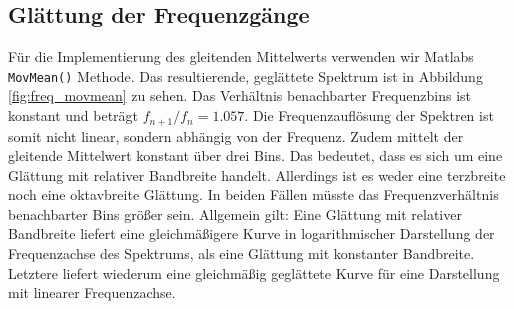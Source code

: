 \subsection{Glättung der Frequenzgänge}
Für die Implementierung des gleitenden Mittelwerts verwenden wir Matlabs \texttt{MovMean()} Methode.
Das resultierende, geglättete Spektrum ist in Abbildung \ref{fig:freq_movmean} zu sehen. Das Verhältnis benachbarter Frequenzbins ist konstant und beträgt $f_{n+1}/f_{n} = 1.057$.
Die Frequenzauflösung der Spektren ist somit nicht linear, sondern abhängig von der Frequenz.
Zudem mittelt der gleitende Mittelwert konstant über drei Bins.
Das bedeutet, dass es sich um eine Glättung mit relativer Bandbreite handelt.
Allerdings ist es weder eine terzbreite noch eine oktavbreite Glättung.
In beiden Fällen müsste das Frequenzverhältnis benachbarter Bins größer sein.
Allgemein gilt: Eine Glättung mit relativer Bandbreite liefert eine gleichmäßigere Kurve in logarithmischer Darstellung der Frequenzachse des Spektrums, als eine Glättung mit konstanter Bandbreite.
Letztere liefert wiederum eine gleichmäßig geglättete Kurve für eine Darstellung mit linearer Frequenzachse.

